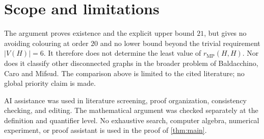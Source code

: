 \documentclass[11pt]{article}
\newcommand{\MP}{\mathrm{MP}}
\begin{document}
\section{Scope and limitations}

The argument proves existence and the explicit upper bound $21$, but gives
no avoiding colouring at order $20$ and no lower bound beyond the trivial
requirement $|V(H)|=6$.  It therefore does not determine the least value of
$r_{\MP}(H,H)$.  Nor does it classify other disconnected graphs in the
broader problem of Baldacchino, Caro and Mifsud.  The comparison above is
limited to the cited literature; no global priority claim is made.

AI assistance was used in literature screening, proof organization,
consistency checking, and editing.  The mathematical argument was checked
separately at the definition and quantifier level.  No exhaustive search,
computer algebra, numerical experiment, or proof assistant is used in the
proof of \cref{thm:main}.



\end{document}

